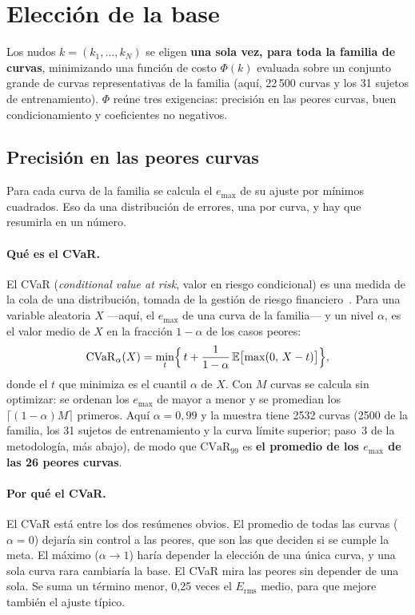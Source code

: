 \section{Elección de la base}
Los nudos $k=(k_1,\ldots,k_N)$ se eligen \textbf{una sola vez, para toda la familia de curvas}, minimizando una función de costo $\Phi(k)$ evaluada sobre un conjunto grande de curvas representativas de la familia (aquí, 22\,500 curvas y los 31 sujetos de entrenamiento). $\Phi$ reúne tres exigencias: precisión en las peores curvas, buen condicionamiento y coeficientes no negativos.

\subsection{Precisión en las peores curvas}
Para cada curva de la familia se calcula el $e_{\max}$ de su ajuste por mínimos cuadrados. Eso da una distribución de errores, una por curva, y hay que resumirla en un número.

\paragraph{Qué es el CVaR.} El CVaR (\emph{conditional value at risk}, valor en riesgo condicional) es una medida de la cola de una distribución, tomada de la gestión de riesgo financiero~\cite{rockafellar}. Para una variable aleatoria $X$ ---aquí, el $e_{\max}$ de una curva de la familia--- y un nivel $\alpha$, es el valor medio de $X$ en la fracción $1-\alpha$ de los casos peores:
\begin{equation}\label{eq:cvar}
\mathrm{CVaR}_\alpha(X)=\min_{t}\Bigl\{\,t+\frac{1}{1-\alpha}\,\mathbb E\bigl[\max(0,\,X-t)\bigr]\Bigr\},
\end{equation}
donde el $t$ que minimiza es el cuantil $\alpha$ de $X$. Con $M$ curvas se calcula sin optimizar: se ordenan los $e_{\max}$ de mayor a menor y se promedian los $\lceil(1-\alpha)M\rceil$ primeros. Aquí $\alpha=0{,}99$ y la muestra tiene 2532 curvas (2500 de la familia, los 31 sujetos de entrenamiento y la curva límite superior; paso~3 de la metodología, más abajo), de modo que $\mathrm{CVaR}_{99}$ es \textbf{el promedio de los $e_{\max}$ de las 26 peores curvas}.

\paragraph{Por qué el CVaR.} El CVaR está entre los dos resúmenes obvios. El promedio de todas las curvas ($\alpha=0$) dejaría sin control a las peores, que son las que deciden si se cumple la meta. El máximo ($\alpha\to1$) haría depender la elección de una única curva, y una sola curva rara cambiaría la base. El CVaR mira las peores sin depender de una sola. Se suma un término menor, 0,25 veces el $E_{\mathrm{rms}}$ medio, para que mejore también el ajuste típico.

